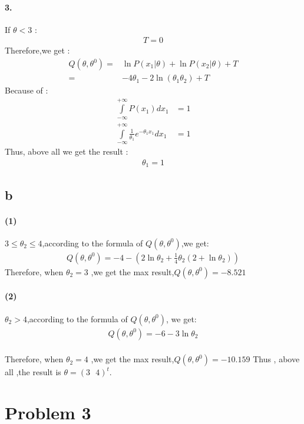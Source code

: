 \documentclass[]{article}
\begin{document}
\paragraph{3.} If $\theta < 3$ :
\begin{align*}
	T = 0
\end{align*}
Therefore,we get :
\begin{align*}
	Q(\theta,\theta^0) =& \ln P(x_1|\theta)+\ln P(x_2|\theta) + T \\
	=&-4\theta_1 - 2\ln (\theta_1 \theta_2) + T
\end{align*}
Because of :
\begin{align*}
	\int \limits_{-\infty}^{+\infty} P(x_1)dx_1 &= 1 \\
	\int \limits_{-\infty}^{+\infty} \frac{1}{\theta_1}e^{-\theta_1x_1}dx_1 &= 1
\end{align*}
Thus, above all we get the result :
\begin{align*}
	\theta_1 = 1
\end{align*}
\subsection{b}
\paragraph{(1)} $3 \leq \theta_2 \leq 4$,according to the formula of $Q(\theta,\theta^0)$,we get:
\begin{align*}
	Q(\theta,\theta^0) = -4 -\left(2\ln \theta_2 + \frac{1}{4} \theta_2(2+\ln \theta_2) \right)
\end{align*}
Therefore, when $\theta_2 = 3$ ,we get the max result,$Q(\theta,\theta^0) = -8.521$
\paragraph{(2)}$\theta_2 > 4$,according to the formula of $Q(\theta,\theta^0)$, we get:
\begin{align*}
	Q(\theta,\theta^0) = -6-3\ln \theta_2
\end{align*}
\paragraph{}Therefore, when $\theta_2 = 4$ ,we get the max result,$Q(\theta,\theta^0) = -10.159$
Thus , above all ,the result is $\theta = (3 \  \  \  4 )^t$.
    
    \section{Problem 3}
\end{document}

